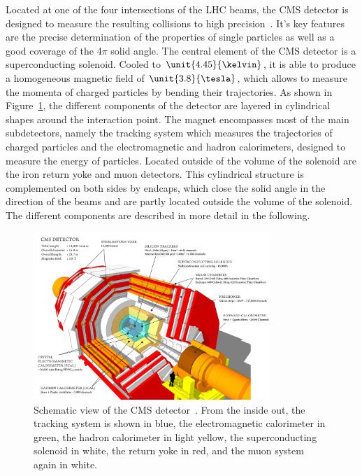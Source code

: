 Located at one of the four intersections of the LHC beams, the CMS detector is designed to measure the resulting collisions to high precision~\cite{CMS}. It's key features are the precise determination of the properties of single particles as well as a good coverage of the 4$\pi$ solid angle. The central element of the CMS detector is a superconducting solenoid. Cooled to $\unit{4.45}{\kelvin}$, it is able to produce a homogeneous magnetic field of $\unit{3.8}{\tesla}$, which allows to measure the momenta of charged particles by bending their trajectories. As shown in Figure~\ref{fig:CMS}, the different components of the detector are layered in cylindrical shapes around the interaction point. The magnet encompasses most of the main subdetectors, namely the tracking system which measures the trajectories of charged particles and the electromagnetic and hadron calorimeters, designed to measure the energy of particles. Located outside of the volume of the solenoid are the iron return yoke and muon detectors. This cylindrical structure is complemented on both sides by endcaps, which close the solid angle in the direction of the beams and are partly located outside the volume of the solenoid. The different components are described in more detail in the following. 
\begin{figure}[htbp]
\centering
  \includegraphics[width=0.8\textwidth]{plots/CMS/cms_design.png}
\caption{Schematic view of the CMS detector~\cite{CMSScetch}. From the inside out, the tracking system is shown in blue, the electromagnetic calorimeter in green, the hadron calorimeter in light yellow, the superconducting solenoid in white, the return yoke in red, and the muon system again in white.}
\label{fig:CMS}
\end{figure}
